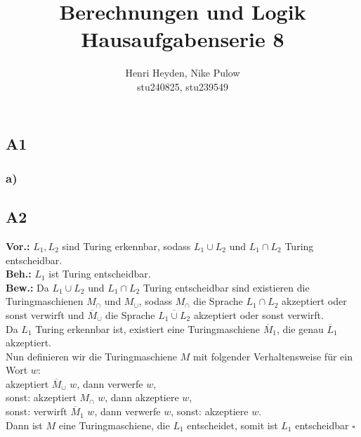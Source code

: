 \documentclass[12pt, a4paper]{article}
\title{Berechnungen und Logik\\Hausaufgabenserie 8}
\author{Henri Heyden, Nike Pulow \\ \small stu240825, stu239549}
\date{}
\newcommand*{\qed}{\null\nobreak\hfill\ensuremath{\square}}
\newcommand*{\gap}{\text{ }}
\newcommand*{\vor}{\textbf{Vor.:} \gap}
\newcommand*{\beh}{\textbf{Beh.:} \gap}
\newcommand*{\bew}{\textbf{Bew.:} \gap}
\begin{document}
\maketitle

\onehalfspacing
\vspace*{-2cm}
\subsection*{A1}
\subsubsection*{a)}
\subsection*{A2}
\vor \(L_1, L_2\) sind Turing erkennbar, sodass \(L_1 \cup L_2\) und \(L_1 \cap L_2\) Turing entscheidbar. \\
\beh \(L_1\) ist Turing entscheidbar. \\
\bew Da \(L_1 \cup L_2\) und \(L_1 \cap L_2\) Turing entscheidbar sind existieren die Turingmaschienen \(M_\cap\) und \(M_\cup\), sodass \(M_\cap\) die Sprache \(L_1 \cap L_2\) akzeptiert oder sonst verwirft und \(\overline M_\cup\) die Sprache \(\overline{L_1 \cup L_2}\) akzeptiert oder sonst verwirft. \\
Da \(L_1\) Turing erkennbar ist, existiert eine Turingmaschiene \(\overline M_1\), die genau \(\overline L_1\) akzeptiert. \\
Nun definieren wir die Turingmaschiene \(M\) mit folgender Verhaltensweise für ein Wort \(w\):\\
akzeptiert \(\overline M_\cup\) \(w\), dann verwerfe \(w\), \\
sonst: akzeptiert \(M_\cap\) \(w\), dann akzeptiere \(w\), \\
sonst: verwirft \(\overline M_1\) \(w\), dann verwerfe \(w\),
sonst: akzeptiere \(w\). \\
Dann ist \(M\) eine Turingmaschiene, die \(L_1\) entscheidet, somit ist \(L_1\) entscheidbar \qed
\end{document}
